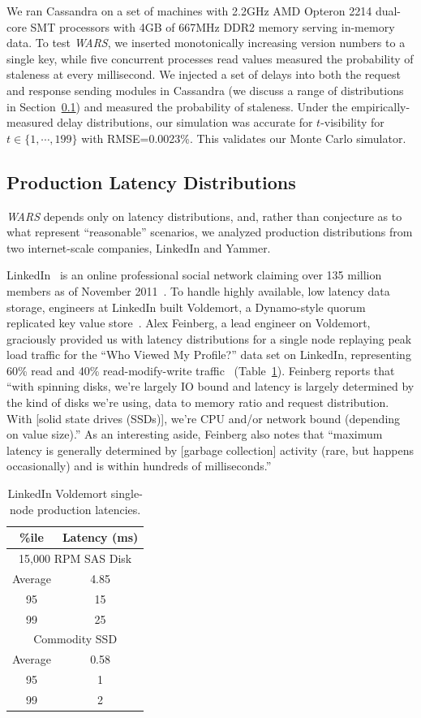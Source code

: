 \documentclass{vldb}
\begin{document}
We ran Cassandra on a set of machines with 2.2GHz AMD Opteron 2214
dual-core SMT processors with 4GB of 667MHz DDR2 memory serving
in-memory data.  To test \textit{WARS}, we inserted monotonically
increasing version numbers to a single key, while five concurrent
processes read values measured the probability of staleness at every
millisecond.  We injected a set of delays into both the request and
response sending modules in Cassandra (we discuss a range of
distributions in Section~\ref{sec:latencies}) and measured the
probability of staleness.  Under the empirically-measured delay
distributions, our simulation was accurate for $t$-visibility for
$t\in\{1,\cdots,199\}$ with RMSE=0.0023\%.  This validates our Monte
Carlo simulator.

\subsection{Production Latency Distributions}
\label{sec:latencies}

\textit{WARS} depends only on latency distributions, and, rather than
conjecture as to what represent ``reasonable'' scenarios, we analyzed
production distributions from two internet-scale companies, LinkedIn
and Yammer.

LinkedIn~\cite{linkedin} is an online professional social network
claiming over 135 million members as of November
2011~\cite{linkedinmembers}. To handle highly available, low latency
data storage, engineers at LinkedIn built Voldemort, a Dynamo-style
quorum replicated key value store~\cite{voldemort, voldemortpub}.
Alex Feinberg, a lead engineer on Voldemort, graciously provided us
with latency distributions for a single node replaying peak load
traffic for the ``Who Viewed My Profile?'' data set on LinkedIn,
representing 60\% read and 40\% read-modify-write
traffic~\cite{feinbergpc} (Table~\ref{table:linkedin}).  Feinberg
reports that ``with spinning disks, we're largely IO bound and latency
is largely determined by the kind of disks we're using, data to memory
ratio and request distribution.  With [solid state drives (SSDs)],
we're CPU and/or network bound (depending on value size).''  As an
interesting aside, Feinberg also notes that ``maximum latency is
generally determined by [garbage collection] activity (rare, but
happens occasionally) and is within hundreds of milliseconds.''

\begin{table}
\centering
\begin{tabular}{|c|c|}
\hline
\%ile & Latency (ms) \\
\hline
\multicolumn{2}{|c|}{ 15,000 RPM SAS Disk}\\
\hline
Average & 4.85\\
95 & 15\\
99 & 25\\
\hline
\multicolumn{2}{|c|}{ Commodity SSD }\\
\hline
Average & 0.58 \\
95 & 1\\
99 & 2\\
\hline
\end{tabular}
\caption{LinkedIn Voldemort single-node production latencies.}
\label{table:linkedin}
\end{table}
\end{document}
